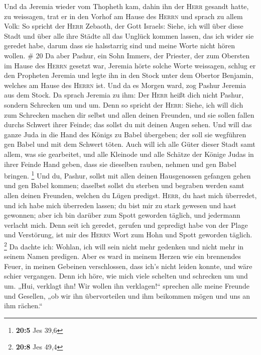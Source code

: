  Und da Jeremia wieder vom Thopheth kam, dahin ihn der
\textsc{Herr} gesandt hatte, zu weissagen, trat er in den Vorhof am
Hause des \textsc{Herrn} und sprach zu allem Volk:  So
spricht der \textsc{Herr} Zebaoth, der Gott Israels: Siehe, ich will
über diese Stadt und über alle ihre Städte all das Unglück kommen
lassen, das ich wider sie geredet habe, darum dass sie halsstarrig sind
und meine Worte nicht hören wollen. \# 20  Da aber Pashur,
ein Sohn Immers, der Priester, der zum Obersten im Hause des
\textsc{Herrn} gesetzt war, Jeremia hörte solche Worte weissagen,
 schlug er den Propheten Jeremia und legte ihn in den
Stock unter dem Obertor Benjamin, welches am Hause des \textsc{Herrn}
ist.  Und da es Morgen ward, zog Pashur Jeremia aus dem
Stock. Da sprach Jeremia zu ihm: Der \textsc{Herr} heißt dich nicht
Pashur, sondern Schrecken um und um.  Denn so spricht der
\textsc{Herr}: Siehe, ich will dich zum Schrecken machen dir selbst und
allen deinen Freunden, und sie sollen fallen durchs Schwert ihrer
Feinde; das sollst du mit deinen Augen sehen. Und will das ganze Juda in
die Hand des Königs zu Babel übergeben; der soll sie wegführen gen Babel
und mit dem Schwert töten.  Auch will ich alle Güter
dieser Stadt samt allem, was sie gearbeitet, und alle Kleinode und alle
Schätze der Könige Judas in ihrer Feinde Hand geben, dass sie dieselben
rauben, nehmen und gen Babel bringen. \footnote{\textbf{20:5} Jes 39,6}
 Und du, Pashur, sollst mit allen deinen Hausgenossen
gefangen gehen und gen Babel kommen; daselbst sollst du sterben und
begraben werden samt allen deinen Freunden, welchen du Lügen predigst.
 \textsc{Herr}, du hast mich überredet, und ich habe mich
überreden lassen; du bist mir zu stark gewesen und hast gewonnen; aber
ich bin darüber zum Spott geworden täglich, und jedermann verlacht mich.
 Denn seit ich geredet, gerufen und gepredigt habe von der
Plage und Verstörung, ist mir des \textsc{Herrn} Wort zum Hohn und Spott
geworden täglich. \footnote{\textbf{20:8} Jes 49,4}  Da
dachte ich: Wohlan, ich will sein nicht mehr gedenken und nicht mehr in
seinem Namen predigen. Aber es ward in meinem Herzen wie ein brennendes
Feuer, in meinen Gebeinen verschlossen, dass ich's nicht leiden konnte,
und wäre schier vergangen.  Denn ich höre, wie mich viele
schelten und schrecken um und um. „Hui, verklagt ihn! Wir wollen ihn
verklagen!{}`` sprechen alle meine Freunde und Gesellen, „ob wir ihn
übervorteilen und ihm beikommen mögen und uns an ihm rächen.``

